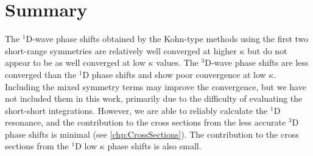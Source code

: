 \documentclass[Dissertation.tex]{subfiles}
\begin{document}
\section{Summary}
\label{sec:SummaryD}

The $^1$D-wave phase shifts obtained by the Kohn-type methods using the first 
two short-range symmetries are relatively well converged at higher
$\kappa$ but do not appear to be as well converged at low $\kappa$ values. The
$^3$D-wave phase shifts are less converged than the $^1$D phase shifts and 
show poor convergence at low $\kappa$. Including the mixed symmetry terms may
improve the convergence, but we have not included them in this work, primarily
due to the difficulty of evaluating the short-short integrations. However, we
are able to reliably calculate the $^1$D resonance, and the contribution to the
cross sections from the less accurate $^3$D phase shifts is minimal
(see \cref{chp:CrossSections}). The contribution to the cross sections from the
$^1$D low $\kappa$ phase shifts is also small.



\biblio
\end{document}
